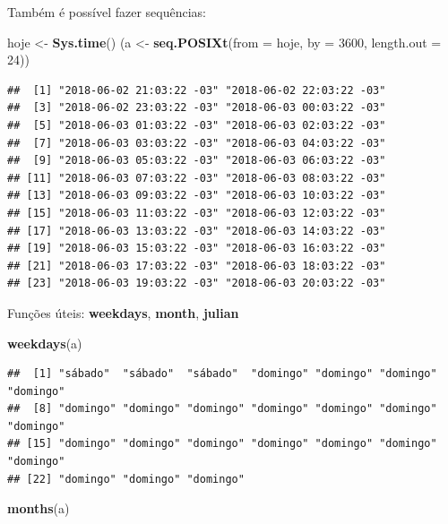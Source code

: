 \documentclass[]{book}
\newenvironment{Shaded}{\begin{snugshade}}{\end{snugshade}}
\newcommand{\KeywordTok}[1]{\textcolor[rgb]{0.13,0.29,0.53}{\textbf{#1}}}
\newcommand{\DataTypeTok}[1]{\textcolor[rgb]{0.13,0.29,0.53}{#1}}
\newcommand{\DecValTok}[1]{\textcolor[rgb]{0.00,0.00,0.81}{#1}}
\newcommand{\StringTok}[1]{\textcolor[rgb]{0.31,0.60,0.02}{#1}}
\newcommand{\NormalTok}[1]{#1}
\theoremstyle{definition}
\theoremstyle{definition}
\theoremstyle{definition}
\theoremstyle{remark}
\begin{document}
Também é possível fazer sequências:

\begin{Shaded}
\begin{Highlighting}[]
\NormalTok{hoje <-}\StringTok{ }\KeywordTok{Sys.time}\NormalTok{()}
\NormalTok{(a <-}\StringTok{ }\KeywordTok{seq.POSIXt}\NormalTok{(}\DataTypeTok{from =}\NormalTok{ hoje, }\DataTypeTok{by =} \DecValTok{3600}\NormalTok{, }\DataTypeTok{length.out =} \DecValTok{24}\NormalTok{))}
\end{Highlighting}
\end{Shaded}

\begin{verbatim}
##  [1] "2018-06-02 21:03:22 -03" "2018-06-02 22:03:22 -03"
##  [3] "2018-06-02 23:03:22 -03" "2018-06-03 00:03:22 -03"
##  [5] "2018-06-03 01:03:22 -03" "2018-06-03 02:03:22 -03"
##  [7] "2018-06-03 03:03:22 -03" "2018-06-03 04:03:22 -03"
##  [9] "2018-06-03 05:03:22 -03" "2018-06-03 06:03:22 -03"
## [11] "2018-06-03 07:03:22 -03" "2018-06-03 08:03:22 -03"
## [13] "2018-06-03 09:03:22 -03" "2018-06-03 10:03:22 -03"
## [15] "2018-06-03 11:03:22 -03" "2018-06-03 12:03:22 -03"
## [17] "2018-06-03 13:03:22 -03" "2018-06-03 14:03:22 -03"
## [19] "2018-06-03 15:03:22 -03" "2018-06-03 16:03:22 -03"
## [21] "2018-06-03 17:03:22 -03" "2018-06-03 18:03:22 -03"
## [23] "2018-06-03 19:03:22 -03" "2018-06-03 20:03:22 -03"
\end{verbatim}

Funções úteis: \textbf{weekdays}, \textbf{month}, \textbf{julian}

\begin{Shaded}
\begin{Highlighting}[]
\KeywordTok{weekdays}\NormalTok{(a)}
\end{Highlighting}
\end{Shaded}

\begin{verbatim}
##  [1] "sábado"  "sábado"  "sábado"  "domingo" "domingo" "domingo" "domingo"
##  [8] "domingo" "domingo" "domingo" "domingo" "domingo" "domingo" "domingo"
## [15] "domingo" "domingo" "domingo" "domingo" "domingo" "domingo" "domingo"
## [22] "domingo" "domingo" "domingo"
\end{verbatim}

\begin{Shaded}
\begin{Highlighting}[]
\KeywordTok{months}\NormalTok{(a)}
\end{Highlighting}
\end{Shaded}
\end{document}

